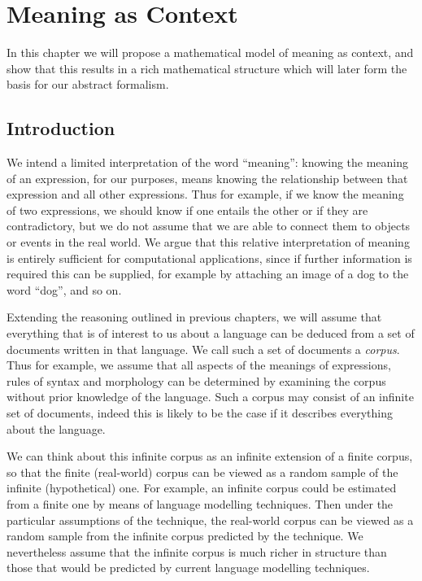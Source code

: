 \documentclass[11pt]{report}
\begin{document}
\chapter{Meaning as Context}


In this chapter we will propose a mathematical model of meaning as context, and show that this results in a rich mathematical structure which will later form the basis for our abstract formalism.

\section{Introduction}

We intend a limited interpretation of the word ``meaning'': knowing the meaning of an expression, for our purposes, means knowing the relationship between that expression and all other expressions.
Thus for example, if we know the meaning of two expressions, we should know if one entails the other or if they are contradictory, but we do not assume that we are able to connect them to objects or events in the real world. We argue that this relative interpretation of meaning is entirely sufficient for computational applications, since if further information is required this can be supplied, for example by attaching an image of a dog to the word ``dog'', and so on.

Extending the reasoning outlined in previous chapters, we will assume that everything that is of interest to us about a language can be deduced from a set of documents written in that language.
We call such a set of documents a \emph{corpus}. Thus for example, we assume that all aspects of the meanings of expressions, rules of syntax and morphology can be determined by examining the corpus without prior knowledge of the language. Such a corpus may consist of an infinite set of documents, indeed this is likely to be the case if it describes everything about the language.

We can think about this infinite corpus as an infinite extension of a finite corpus, so that the finite (real-world) corpus can be viewed as a random sample of the infinite (hypothetical) one. For example, an infinite corpus could be estimated from a finite one by means of language modelling techniques. Then under the particular assumptions of the technique, the real-world corpus can be viewed as a random sample from the infinite corpus predicted by the technique. We nevertheless assume that the infinite corpus is much richer in structure than those that would be predicted by current language modelling techniques.
\end{document}
